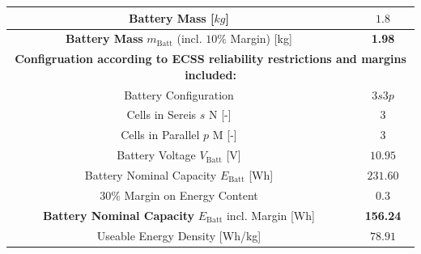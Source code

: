 \begin{table}[htb]
\begin{tabular}{|c|c|}
Battery Mass  [$kg$]                                                               & $1.8$                         \\ \hline
\textbf{Battery Mass} $m_\text{Batt}$ (incl. $10\%$ Margin) [kg]                                         & \textbf{1.98}                        \\ \hline
\multicolumn{2}{|c|}{\textbf{Configruation according to ECSS reliability restrictions and margins included:}} \\ \hline
Battery Configuration                                                           & $3s3p$                        \\ \hline
Cells in Sereis $s$ N [-]                                                       & $3$                           \\ \hline
Cells in Parallel $p$ M [-]                                                     & $3$                           \\ \hline
Battery Voltage $V_\text{Batt}$ [V]                                             & $10.95$                       \\ \hline
Battery Nominal Capacity $E_\text{Batt}$ [Wh]                                   & $231.60$                       \\ \hline
$30\%$ Margin on Energy Content                                                 & $0.3$                         \\ \hline
\textbf{Battery Nominal Capacity} $E_\text{Batt}$ incl. Margin [Wh]                      & \textbf{156.24}                      \\ \hline
Useable Energy Density [Wh/kg]                                              & $78.91$                       \\ \hline
\end{tabular}
\label{tab:battery}
\end{table}

